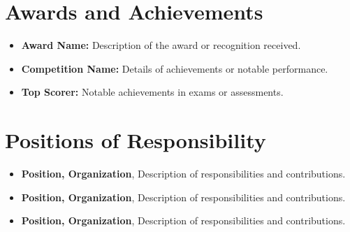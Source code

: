 \documentclass[letterpaper,11pt]{article}
\newcommand{\resumeItem}[1]{
  \item\small{
    {#1 \vspace{-2pt}}
  }
}
\newcommand{\resumeSubHeadingListStart}{\begin{itemize}[leftmargin=0.15in, label={}]}
\newcommand{\resumeSubHeadingListEnd}{\end{itemize}}
\newcommand{\resumeItemListStart}{\begin{itemize}}
\newcommand{\resumeItemListEnd}{\end{itemize}\vspace{-5pt}}
\begin{document}

\section{Awards and Achievements}
\vspace{0pt}
\resumeSubHeadingListStart
  \resumeItemListStart
    \resumeItem{\textbf{Award Name:} Description of the award or recognition received.}
    \resumeItem{\textbf{Competition Name:} Details of achievements or notable performance.}
    \resumeItem{\textbf{Top Scorer:} Notable achievements in exams or assessments.}
  \resumeItemListEnd
\resumeSubHeadingListEnd
\vspace{-10pt}


\section{Positions of Responsibility}
\vspace{0pt}
\resumeSubHeadingListStart
  \resumeItemListStart
    \resumeItem{\textbf{Position, Organization}, Description of responsibilities and contributions.}
    \resumeItem{\textbf{Position, Organization}, Description of responsibilities and contributions.}
    \resumeItem{\textbf{Position, Organization}, Description of responsibilities and contributions.}
  \resumeItemListEnd
\resumeSubHeadingListEnd
\end{document}
